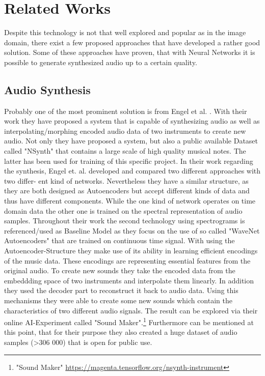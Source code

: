 \chapter{Related Works}

Despite this technology is not that well explored and popular as in the image domain, there exist a few proposed approaches that have developed a rather good solution. Some of these approaches have proven, that with Neural Networks it is possible to generate synthesized audio up to a certain quality.

\section{Audio Synthesis}
Probably one of the most prominent solution is from Engel et al. \cite{Engel2017}. With their work they have proposed a system that is capable of synthesizing audio as well as interpolating/morphing encoded audio data of two instruments to create new audio. Not only they have proposed a system, but also a public available Dataset called "NSynth" that contains a large scale of high quality musical notes. The latter has been used for training of this specific project. In their work regarding the synthesis, Engel et. al. developed and compared two different approaches with two differ- ent kind of networks. Nevertheless they have a similar structure, as they are both designed as Autoencoders but accept different kinds of data and thus have different components. While the one kind of network operates on time domain data the other one is trained on the spectral representation of audio samples. Throughout their work the second technology using spectrograms is referenced/used as Baseline Model as they focus on the use of so called "WaveNet Autoencoders" that are trained on continuous time signal. With using the Autoencoder-Structure they make use of its ability in learning efficient encodings of the music data. These encodings are representing essential features from the original audio. To create new sounds they take the encoded data from the embeddding space of two instruments and interpolate them linearly. In addition they used the decoder part to reconstruct it back to audio data. Using this mechanisms they were able to create some new sounds which contain the characteristics of two different audio signals. The result can be explored via their online AI-Experiment called "Sound Maker".\footnote{"Sound Maker" \url{https://magenta.tensorflow.org/nsynth-instrument}} Furthermore can be mentioned at this point, that for their purpose they also created a huge dataset of audio samples (>306 000) that is open for public use.

